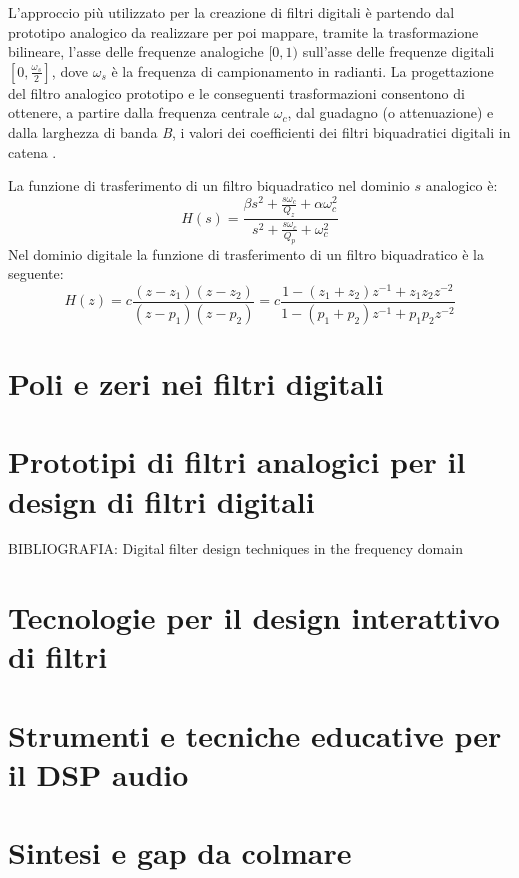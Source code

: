 \documentclass[12pt]{report}
\begin{document}
L'approccio più utilizzato per la creazione di filtri digitali è partendo dal prototipo analogico da realizzare per poi mappare, tramite la trasformazione bilineare, l'asse delle frequenze analogiche \([0,1)\) sull'asse delle frequenze digitali \([0,\frac{\omega_s}{2}]\), dove \(\omega_s\) è la frequenza di campionamento in radianti.
La progettazione del filtro analogico prototipo e le conseguenti trasformazioni consentono di ottenere, a partire dalla frequenza centrale \(\omega_c\), dal guadagno (o attenuazione) e dalla larghezza di banda \textit{B}, i valori dei coefficienti dei filtri biquadratici digitali in catena \parencite{reiss2010design}.

La funzione di trasferimento di un filtro biquadratico nel dominio \( s \) analogico è:
\begin{equation}
    H(s)=\frac{\beta s^2 + \frac{s\omega_c}{Q_z} + \alpha \omega_c^2}{s^2 + \frac{s\omega_c}{Q_p} + \omega_c^2}
    \label{eq:analog_biquad}
\end{equation}
\parencite{shpak1991analytical}
Nel dominio digitale la funzione di trasferimento di un filtro biquadratico è la seguente:
\begin{equation}
    H(z)=c\frac{(z-z_1)(z-z_2)}{(z-p_1)(z-p_2)} = c\frac{1-(z_1+z_2)z^{-1} + z_1z_2z^{-2}}{1-(p_1+p_2)z^{-1} + p_1p_2z^{-2}}
\end{equation}
\parencite{reiss2010design}


\section{Poli e zeri nei filtri digitali}

\section{Prototipi di filtri analogici per il design di filtri digitali}
BIBLIOGRAFIA: Digital filter design techniques in the frequency domain

\section{Tecnologie per il design interattivo di filtri}

\section{Strumenti e tecniche educative per il DSP audio}

\section{Sintesi e gap da colmare}
\end{document}
